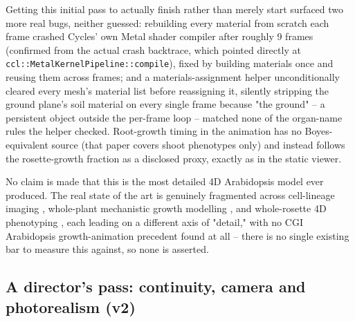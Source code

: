 Getting this initial pass to actually finish rather than merely start surfaced two more real bugs,
neither guessed: rebuilding every material from scratch each frame crashed Cycles' own
Metal shader compiler after roughly 9 frames (confirmed from the actual crash backtrace,
which pointed directly at \texttt{ccl::MetalKernelPipeline::compile}), fixed by building
materials once and reusing them across frames; and a materials-assignment helper
unconditionally cleared every mesh's material list before reassigning it, silently
stripping the ground plane's soil material on every single frame because "the ground" -- a
persistent object outside the per-frame loop -- matched none of the organ-name rules the
helper checked. Root-growth timing in the animation has no Boyes-equivalent source (that
paper covers shoot phenotypes only) and instead follows the rosette-growth fraction as a
disclosed proxy, exactly as in the static viewer.

No claim is made that this is the most detailed 4D Arabidopsis model ever produced. The
real state of the art is genuinely fragmented across cell-lineage imaging
\citep{Fernandez2010}, whole-plant mechanistic growth modelling \citep{Chew2014}, and
whole-rosette 4D phenotyping \citep{Apelt2015,Bernotas2019}, each leading on a different axis
of "detail," with no CGI Arabidopsis growth-animation precedent found at all -- there is no
single existing bar to measure this against, so none is asserted.

\subsection{A director's pass: continuity, camera and photorealism (v2)}

